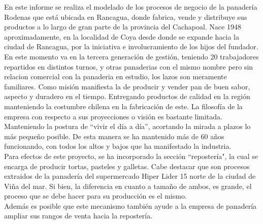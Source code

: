 En este informe se realiza el modelado de los procesos de negocio de la panadería Rodenas que está ubicada en Rancagua, donde fabrica, vende y distribuye sus productos a lo largo de gran parte de la provincia del Cachapoal. Nace 1948 aproximadamente, en la localidad de Coya desde donde se expande hacia la ciudad de Rancagua, por la iniciativa e involucramiento de los hijos del fundador. En este momento va en la tercera generación de gestión, teniendo 20 trabajadores repartidos en distintos turnos, y otras panaderias con el mismo nombre pero sin relacion comercial con la panaderia en estudio, los lazos son meramente familiares.
Como misión manifiesta la de producir y vender pan de buen sabor, aspecto y duradero en el tiempo. Entregando productos de calidad en la región manteniendo la costumbre chilena en la fabricación de este.
La filosofía de la empresa con respecto a sus proyecciones o visión es bastante limitada. Manteniendo la postura de “vivir el día a día”, acortando la mirada a plazos lo más pequeño posible. De esta manera se ha mantenido más de 60 años funcionando, con todos los altos y bajos que ha manifestado la industria.
\\
Para efectos de este proyecto, se ha incorporado la sección ``repostería", la cual se encarga de producir tortas, pasteles y galletas. Cabe destacar que son procesos extraidos de la panadería del supermercado Hiper Lider 15 norte de la ciudad de Viña del mar. Si bien, la diferencia en cuanto a tamaño de ambos, es grande, el proceso que se debe hacer para su producción es el mismo. \\
Además es posible que este mecanismo también ayude a la empresa de panadería ampliar sus rangos de venta hacia la repostería.
